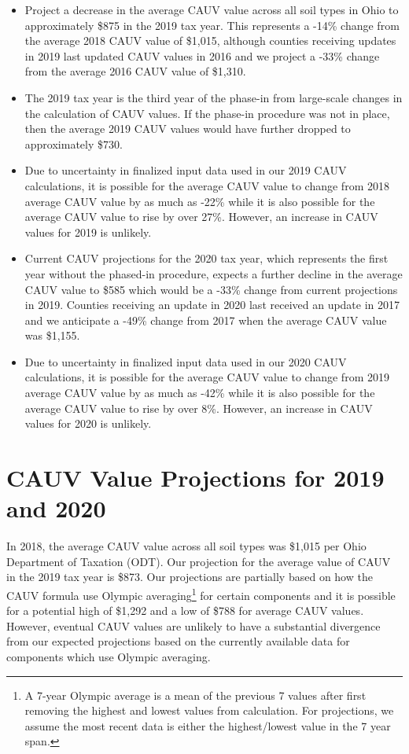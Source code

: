 \documentclass[]{article}
\providecommand{\tightlist}{%
  \setlength{\itemsep}{0pt}\setlength{\parskip}{0pt}}
\let\rmarkdownfootnote\footnote%
\def\footnote{\protect\rmarkdownfootnote}
\begin{document}
\begin{itemize}
\tightlist
\item
  Project a decrease in the average CAUV value across all soil types in
  Ohio to approximately \$875 in the 2019 tax year. This represents a
  -14\% change from the average 2018 CAUV value of \$1,015, although
  counties receiving updates in 2019 last updated CAUV values in 2016
  and we project a -33\% change from the average 2016 CAUV value of
  \$1,310.
\item
  The 2019 tax year is the third year of the phase-in from large-scale
  changes in the calculation of CAUV values. If the phase-in procedure
  was not in place, then the average 2019 CAUV values would have further
  dropped to approximately \$730.
\item
  Due to uncertainty in finalized input data used in our 2019 CAUV
  calculations, it is possible for the average CAUV value to change from
  2018 average CAUV value by as much as -22\% while it is also possible
  for the average CAUV value to rise by over 27\%. However, an increase
  in CAUV values for 2019 is unlikely.
\item
  Current CAUV projections for the 2020 tax year, which represents the
  first year without the phased-in procedure, expects a further decline
  in the average CAUV value to \$585 which would be a -33\% change from
  current projections in 2019. Counties receiving an update in 2020 last
  received an update in 2017 and we anticipate a -49\% change from 2017
  when the average CAUV value was \$1,155.
\item
  Due to uncertainty in finalized input data used in our 2020 CAUV
  calculations, it is possible for the average CAUV value to change from
  2019 average CAUV value by as much as -42\% while it is also possible
  for the average CAUV value to rise by over 8\%. However, an increase
  in CAUV values for 2020 is unlikely.
\end{itemize}

\newpage
{}

\hypertarget{cauv-value-projections-for-2019-and-2020}{%
\section{CAUV Value Projections for 2019 and
2020}\label{cauv-value-projections-for-2019-and-2020}}

In 2018, the average CAUV value across all soil types was \$1,015 per
Ohio Department of Taxation (ODT). Our projection for the average value
of CAUV in the 2019 tax year is \$873. Our projections are partially
based on how the CAUV formula use Olympic averaging\footnote{A 7-year
  Olympic average is a mean of the previous 7 values after first
  removing the highest and lowest values from calculation. For
  projections, we assume the most recent data is either the
  highest/lowest value in the 7 year span.} for certain components and
it is possible for a potential high of \$1,292 and a low of \$788 for
average CAUV values. However, eventual CAUV values are unlikely to have
a substantial divergence from our expected projections based on the
currently available data for components which use Olympic averaging.
\end{document}
